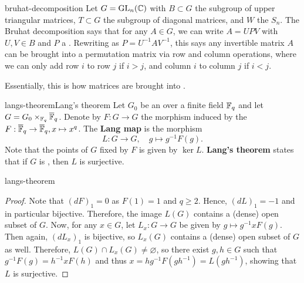 \begin{example}{bruhat-decomposition}
    Let $G = \textup{GL}_n(\mathbb{C})$ with $B \subset G$ the subgroup of upper triangular matrices, $T \subset G$ the subgroup of diagonal matrices, and $W$ the  $S_n$. The Bruhat decomposition says that for any $A \in G$, we can write $A = U P V$ with $U, V \in B$ and $P$ a . Rewriting as $P = U^{-1} A V^{-1}$, this says any invertible matrix $A$ can be brought into a permutation matrix via row and column operations, where we can only add row $i$ to row $j$ if $i > j$, and column $i$ to column $j$ if $i < j$.
    
    Essentially, this is how matrices are brought into .
\end{example}

\begin{topic}{langs-theorem}{Lang's theorem}
    Let $G_0$ be an  over a finite field $\mathbb{F}_q$ and let $G = G_0 \times_{\mathbb{F}_q} \overline{\mathbb{F}}_q$. Denote by $F : G \to G$ the morphism induced by the  $F : \overline{\mathbb{F}}_q \to \overline{\mathbb{F}}_q, x \mapsto x^q$. The \textbf{Lang map} is the morphism
    \[ L : G \to G, \quad g \mapsto g^{-1} F(g) . \]
    Note that the points of $G$ fixed by $F$ is given by $\ker L$. \textbf{Lang's theorem} states that if $G$ is , then $L$ is surjective.
\end{topic}

\begin{example}{langs-theorem}
    \begin{proof}
        Note that $(dF)_1 = 0$ as $F(1) = 1$ and $q \ge 2$. Hence, $(dL)_1 = -1$ and in particular bijective. Therefore, the image $L(G)$ contains a (dense) open subset of $G$. Now, for any $x \in G$, let $L_x : G \to G$ be given by $g \mapsto g^{-1} x F(g)$. Then again, $(dL_x)_1$ is bijective, so $L_x(G)$ contains a (dense) open subset of $G$ as well. Therefore, $L(G) \cap L_x(G) \ne \varnothing$, so there exist $g, h \in G$ such that $g^{-1} F(g) = h^{-1} x F(h)$ and thus $x = hg^{-1} F(gh^{-1}) = L(gh^{-1})$, showing that $L$ is surjective.
    \end{proof}
\end{example}

